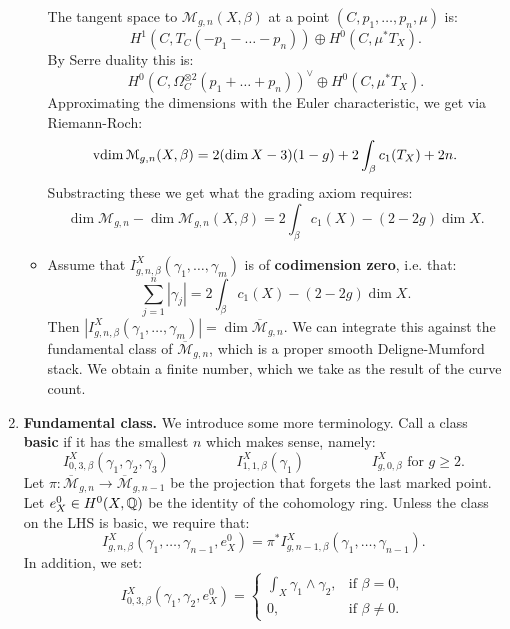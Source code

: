 \begin{defin}[2.2 in \cite{km_gw}]
\begin{enumerate}
\begin{itemize}
The tangent space to $\mathcal{M}_{g,n}(X, \beta)$ at a point $(C,p_1, \dots, p_n, \mu)$ is:
\[	H^1(C,T_C(-p_1-\dots-p_n)) \oplus H^0(C,\mu^*T_X).	\]
By Serre duality this is:
\[	H^0(C,\Omega^{\otimes 2}_C(p_1+\dots+p_n))^{\vee} \oplus H^0(C,\mu^*T_X).	\]
Approximating the dimensions with the Euler characteristic, we get via Riemann-Roch:
\begin{equation}
\label{eq:vdim}
	\operatorname{vdim} \mathcal{M}_{g,n}(X, \beta) = 2(\dim X - 3)(1-g) + 2\int_{\beta} c_1(T_X) + 2n .
\end{equation}
Substracting these we get what the grading axiom requires:
\[	\dim \mathcal{M}_{g,n}- \dim \mathcal{M}_{g,n}(X,\beta) = 2 \int_{\beta} c_1(X) - (2-2g) \dim X.	\]
\item Assume that $I_{g,n,\beta}^X(\gamma_1, \dots, \gamma_m)$ is of \textbf{codimension zero}, i.e. that:
\begin{equation}
\label{eq:codimension_zero}
\sum_{j=1}^n |\gamma_j| = 2 \int_{\beta} c_1(X) - (2-2g) \dim X.
\end{equation}
Then $\left| I_{g,n,\beta}^X(\gamma_1, \dots, \gamma_m)\right| = \dim \overline{\mathcal{M}}_{g,n}$.
We can integrate this against the fundamental class of $\overline{\mathcal{M}}_{g,n}$, which is a proper smooth
Deligne-Mumford stack.  We obtain a finite number, which we take as the result of the curve count.
\end{itemize}

\item \textbf{Fundamental class.} We introduce some more terminology. Call a class \textbf{basic} if it has the smallest
$n$ which makes sense, namely:
\[	I_{0,3,\beta}^X(\gamma_1, \gamma_2, \gamma_3) \hspace{2cm} I_{1,1,\beta}^X(\gamma_1) \hspace{2cm} I_{g,0,\beta}^X
\text{ for } g\geq 2.	\]
Let $\pi: \overline{\mathcal{M}}_{g,n} \to \overline{\mathcal{M}}_{g,n-1}$ be the projection that forgets the last marked point.
Let $e_X^0 \in H^0(X,\mathbb Q)$ be the identity of the cohomology ring.
Unless the class on the LHS is basic, we require that:
\[	I^X_{g,n,\beta}(\gamma_1, \dots, \gamma_{n-1}, e_X^0) = \pi^* I^X_{g,n-1,\beta}(\gamma_1, \dots, \gamma_{n-1}).	\]
In addition, we set:
\[	I^X_{0,3,\beta}(\gamma_1, \gamma_2, e_X^0) = \left\{ \begin{array} {ll} \int_X \gamma_1 \wedge \gamma_2, & \text{if } \beta = 0, \\
0, & \text{if } \beta \neq 0. \end{array} \right.	\]


\end{enumerate}
\end{defin}
